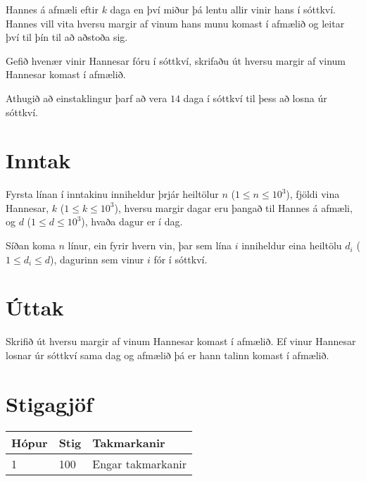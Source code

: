 
Hannes á afmæli eftir $k$ daga en því miður þá lentu allir vinir hans
í sóttkví. Hannes vill vita hversu margir af vinum hans munu komast
í afmælið og leitar því til þín til að aðstoða sig.

Gefið hvenær vinir Hannesar fóru í sóttkví, skrifaðu út hversu
margir af vinum Hannesar komast í afmælið.

Athugið að einstaklingur þarf að vera $14$ daga í sóttkví til þess að losna úr sóttkví.

\section*{Inntak}
Fyrsta línan í inntakinu inniheldur þrjár heiltölur $n$ ($1 \leq n \leq
10^3$), fjöldi vina Hannesar, $k$ ($1 \leq k \leq 10^3$), hversu margir dagar
eru þangað til Hannes á afmæli, og $d$ ($1 \leq d \leq 10^3$), hvaða dagur er
í dag.

Síðan koma $n$ línur, ein fyrir hvern vin, þar sem lína $i$ inniheldur eina
heiltölu $d_i$ ($1 \leq d_i \leq d$), dagurinn sem vinur $i$ fór í sóttkví.

\section*{Úttak}
Skrifið út hversu margir af vinum Hannesar komast í afmælið. Ef vinur Hannesar losnar
úr sóttkví sama dag og afmælið þá er hann talinn komast í afmælið.

\section*{Stigagjöf}
\begin{tabular}{|l|l|l|}
\hline
Hópur & Stig & Takmarkanir \\ \hline
1     & 100  & Engar takmarkanir \\ \hline
\end{tabular}
